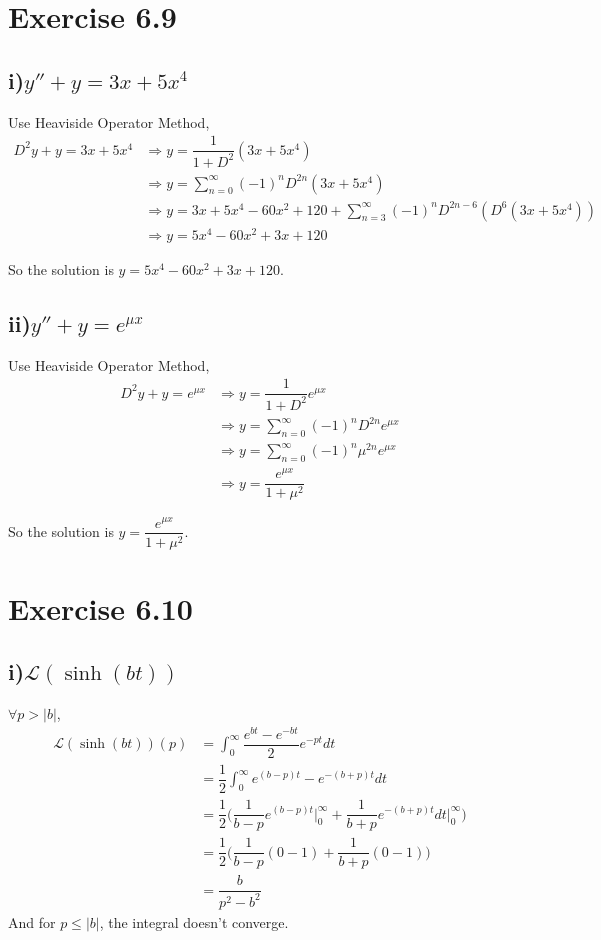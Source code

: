 \documentclass[a4paper,12pt,titlepage]{article}
\begin{document}
\section*{Exercise 6.9}
\subsection*{i)$y''+y=3x+5x^4$}
Use Heaviside Operator Method,
\begin{align*}
D^2y+y=3x+5x^4&\Rightarrow y=\dfrac{1}{1+D^2}(3x+5x^4)\\
&\Rightarrow y=\sum\limits_{n=0}^{\infty}(-1)^nD^{2n}(3x+5x^4)\\
&\Rightarrow y=3x+5x^4-60x^2+120+\sum\limits_{n=3}^{\infty}(-1)^nD^{2n-6}(D^6(3x+5x^4))\\
&\Rightarrow y=5x^4-60x^2+3x+120
\end{align*}

So the solution is $y=5x^4-60x^2+3x+120$.

\subsection*{ii)$y''+y=e^{\mu x}$}
Use Heaviside Operator Method,
\begin{align*}
D^2y+y=e^{\mu x}&\Rightarrow y=\dfrac{1}{1+D^2}e^{\mu x}\\
&\Rightarrow y=\sum\limits_{n=0}^{\infty}(-1)^nD^{2n}e^{\mu x}\\
&\Rightarrow y=\sum\limits_{n=0}^{\infty}(-1)^n\mu^{2n}e^{\mu x}\\
&\Rightarrow y=\dfrac{e^{\mu x}}{1+\mu^2}
\end{align*}

So the solution is $y=\dfrac{e^{\mu x}}{1+\mu^2}$.


\section*{Exercise 6.10}
\subsection*{i)$\mathcal{L}(\sinh(bt))$}
$\forall p>|b|$,
\begin{align*}
\mathcal{L}(\sinh (bt))(p)&=\int_0^{\infty}\dfrac{e^{bt}-e^{-bt}}{2}e^{-pt}dt\\
&=\dfrac{1}{2}\int_0^{\infty}e^{(b-p)t}-e^{-(b+p)t}dt\\
&=\dfrac{1}{2}\big(\dfrac{1}{b-p}e^{(b-p)t}\big|_0^{\infty}+\dfrac{1}{b+p}e^{-(b+p)t}dt\big|_0^{\infty}\big)\\
&=\dfrac{1}{2}(\dfrac{1}{b-p}(0-1)+\dfrac{1}{b+p}(0-1)\big)\\
&=\dfrac{b}{p^2-b^2}
\end{align*}
And for $ p\leqslant|b|$, the integral doesn't converge.
\end{document}
